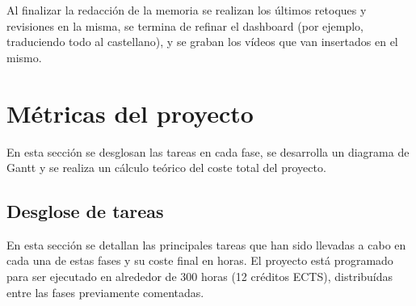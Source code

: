 Al finalizar la redacción de la memoria se realizan los últimos retoques y revisiones en la misma, se termina de refinar el dashboard (por ejemplo, traduciendo todo al castellano), y se graban los vídeos que van insertados en el mismo.

\section{Métricas del proyecto}
En esta sección se desglosan las tareas en cada fase, se desarrolla un diagrama de Gantt y se realiza un cálculo teórico del coste total del proyecto.

\subsection{Desglose de tareas}
En esta sección se detallan las principales tareas que han sido llevadas a cabo en cada una de estas fases y su coste final en horas. El proyecto está programado para ser ejecutado en alrededor de 300 horas (12 créditos ECTS), distribuídas entre las fases previamente comentadas.

